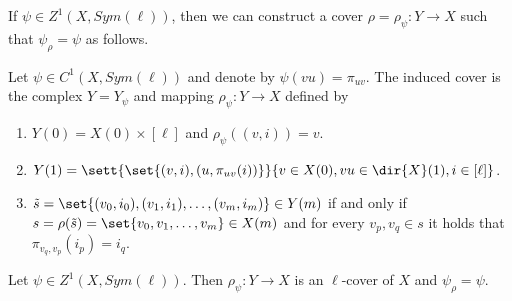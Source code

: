 If \(\psi \in Z^1(X,Sym(\ell))\), then we can construct a cover \(\rho=\rho_\psi:Y \to X\) such that \(\psi_{\rho} = \psi\) as follows.
\begin{definition} \label{def:induced-cover}
    Let \(\psi \in C^1(X,Sym(\ell))\) and denote by \(\psi(vu)=\pi_{uv}\). The induced cover is the complex \(Y=Y_\psi\) and mapping \(\rho_\psi:Y \to X\) defined by
    \begin{enumerate}
        \item \(Y(0) = X(0) \times [\ell]\) and \(\rho_\psi((v,i))=v\).
        \item \(Y(1) = \sett{\set{(v,i),(u,\pi_{uv}(i))}}{v \in X(0), vu \in \dir{X}(1), i \in [\ell]}\).
        \item \(\tilde{s}=\set{(v_0,i_0),(v_1,i_1),\dots, (v_m,i_m)} \in Y(m)\) if and only if \(s=\rho(\tilde{s})=\set{v_0,v_1,\dots,v_m} \in X(m)\) and for every \(v_{p},v_{q} \in s\) it holds that \(\pi_{v_q,v_p}(i_p)=i_q\).
    \end{enumerate}
\end{definition}

\begin{claim} \label{claim:reconstruction of a cover}
    Let \(\psi \in Z^1(X,Sym(\ell))\). Then \(\rho_\psi:Y \to X\) is an \(\ell\)-cover of \(X\) and \(\psi_{\rho}=\psi\).
\end{claim}

